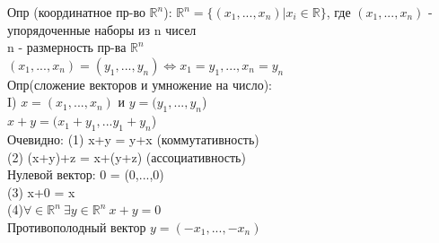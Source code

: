 \documentclass[12pt, oneside]{book}
\theoremstyle{definition}
\begin{document}
\begin{enumerate}
Опр (координатное пр-во ${\mathbb{R}}^n$): ${\mathbb{R}}^n = \{(x_1,...,x_n)|x_i \in\mathbb{R}\}$, где $(x_1,...,x_n)$ - упорядоченные наборы из n чисел\\
n - размерность пр-ва ${\mathbb{R}}^n$\\
$(x_1,...,x_n) =(y_1,...,y_n) \Leftrightarrow x_1 =y_1, ... , x_n = y_n$\\
Опр(сложение векторов и умножение на число):\\
I) $x = (x_1 , ... , x_n)$ и $y = (y_1, ... , y_n$)\\
$x+y = (x_1+y_1 , ... y_1+y_n$)\\
Очевидно: (1) x+y = y+x (коммутативность)\\
(2) (x+y)+z = x+(y+z) (ассоциативность)\\
Нулевой вектор: 0 = (0,...,0)\\
(3) x+0 = x\\
(4)$\forall \in {\mathbb{R}}^n \ \exists y \in {\mathbb{R}}^n \  x+y = 0$\\
Противополодный вектор $y = (-x_1, ..., -x_n)$\\


\end{enumerate}
\end{document}
